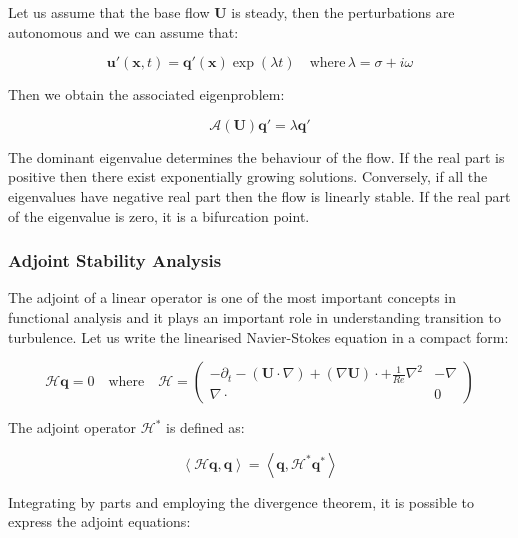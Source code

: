 Let us assume that the base flow  $\mathbf{U}$ is steady, then the perturbations are autonomous and we can assume that:

\begin{equation}
   \mathbf{u'}(\mathbf{x},t)=\mathbf{q'}(\mathbf{x})\exp(\lambda t) \quad \mbox{where} \, \lambda=\sigma+i \omega
\end{equation}

Then we obtain the associated eigenproblem:

\begin{equation}
   \mathcal{A}(\mathbf{U})\mathbf{q'}=\lambda \mathbf{q'}
\end{equation}

The dominant eigenvalue determines the behaviour of the flow. If the real part
is positive then there exist exponentially growing solutions. Conversely, if all
the eigenvalues have negative real part then the flow is linearly stable. If the real part of the eigenvalue is zero, it is a bifurcation point.

\subsubsection{Adjoint Stability Analysis}

The adjoint of a linear operator is one of the most important concepts in
functional analysis and it plays an important role in understanding transition to turbulence. Let us write the linearised Navier-Stokes equation in a compact form:

\begin{equation}
\mathcal{H}\mathbf{q}=0 \quad \mbox{where} \quad \mathcal{H}=\left( \begin{array}{c|c}
  -\partial_t-(\mathbf{U} \cdot \nabla)+ (\nabla \mathbf{U}) \cdot + \frac{1}{Re} \nabla^2 & -\nabla \\
  \hline
  \nabla \cdot  & 0
   \end{array}
 \right)
 \end{equation}


The adjoint operator $\mathcal{H}^*$ is defined as:

\begin{equation}
\left \langle \mathcal{H}\mathbf{q}, \mathbf{q} \right \rangle= \left \langle \mathbf{q}, \mathcal{H}^*\mathbf{q}^* \right \rangle
\end{equation}

Integrating by parts and employing the divergence theorem, it is possible to express the adjoint equations:

